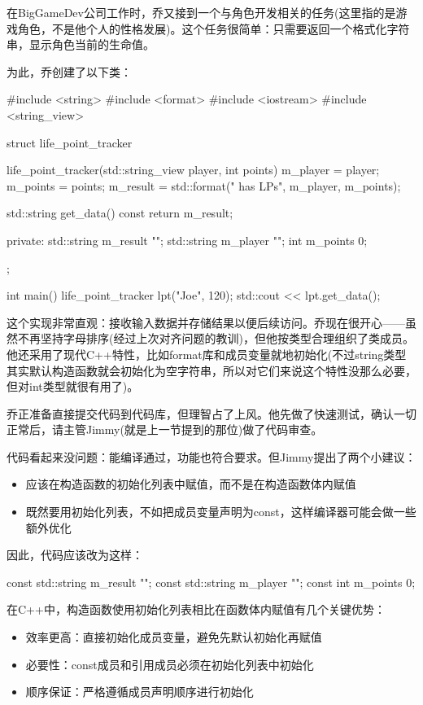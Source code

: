 
在BigGameDev公司工作时，乔又接到一个与角色开发相关的任务(这里指的是游戏角色，不是他个人的性格发展)。这个任务很简单：只需要返回一个格式化字符串，显示角色当前的生命值。

为此，乔创建了以下类：

\begin{cpp}
#include <string>
#include <format>
#include <iostream>
#include <string_view>

struct life_point_tracker {
  life_point_tracker(std::string_view player, int points) {
    m_player = player;
    m_points = points;
    m_result = std::format("{} has {} LPs",
    m_player, m_points);
  }

  std::string get_data() const {
    return m_result;
  }

private:
  std::string m_result {""};
  std::string m_player {""};
  int m_points {0};
};

int main() {
  life_point_tracker lpt("Joe", 120);
  std::cout << lpt.get_data();
}
\end{cpp}


这个实现非常直观：接收输入数据并存储结果以便后续访问。乔现在很开心——虽然不再坚持字母排序(经过上次对齐问题的教训)，但他按类型合理组织了类成员。他还采用了现代C++特性，比如format库和成员变量就地初始化(不过string类型其实默认构造函数就会初始化为空字符串，所以对它们来说这个特性没那么必要，但对int类型就很有用了)。

乔正准备直接提交代码到代码库，但理智占了上风。他先做了快速测试，确认一切正常后，请主管Jimmy(就是上一节提到的那位)做了代码审查。

代码看起来没问题：能编译通过，功能也符合要求。但Jimmy提出了两个小建议：

\begin{itemize}
\item 
应该在构造函数的初始化列表中赋值，而不是在构造函数体内赋值

\item 
既然要用初始化列表，不如把成员变量声明为const，这样编译器可能会做一些额外优化
\end{itemize}

因此，代码应该改为这样：

\begin{cpp}
const std::string m_result {""};
const std::string m_player {""};
const int m_points {0};
\end{cpp}

在C++中，构造函数使用初始化列表相比在函数体内赋值有几个关键优势：

\begin{itemize}
\item 
效率更高：直接初始化成员变量，避免先默认初始化再赋值

\item 
必要性：const成员和引用成员必须在初始化列表中初始化

\item 
顺序保证：严格遵循成员声明顺序进行初始化
\end{itemize}


